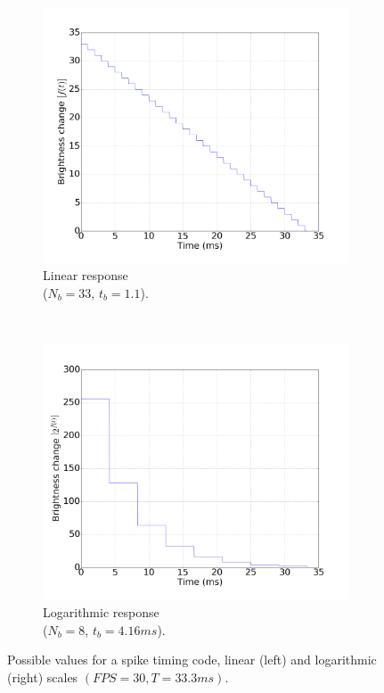 \documentclass[conference]{IEEEtran}
\begin{document}
\begin{figure}[hbt]
  \captionsetup[subfigure]{justification=centering}
  \begin{center}
    \begin{subfigure}[b]{0.25\textwidth}
      \includegraphics[width=\textwidth]{linear_response_graph}
      \caption{Linear response \\($N_{b}=33$, $t_{b}=1.1$).}
      \label{fig:linear_time_resp}
    \end{subfigure}~
    \begin{subfigure}[b]{0.25\textwidth}
      \includegraphics[width=\textwidth]{logarithmic_response_graph}
      \caption{Logarithmic response\\($N_{b}=8$, $t_{b}=4.16ms$).}
      \label{fig:logaritmic_time_resp}
    \end{subfigure}
    
    \caption{Possible values for a spike timing code, linear (left) and logarithmic (right) scales $\left(FPS = 30, T=33.3 ms\right)$.}
    \label{fig:linear_log_response}
  \end{center}
\end{figure}
\end{document}
